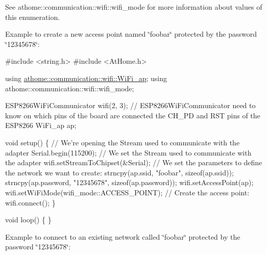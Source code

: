 See athome\+::communication\+::wifi\+::wifi\+\_\+mode for more information about values of this enumeration.

Example to create a new access point named \char`\"{}foobar\char`\"{} protected by the password \char`\"{}12345678\char`\"{}\+:


\begin{DoxyCode}
\textcolor{preprocessor}{#include <string.h>}
\textcolor{preprocessor}{#include <AtHome.h>}

\textcolor{keyword}{using} \mbox{\hyperlink{structathome_1_1communication_1_1wifi_1_1s__wifi__access__point}{athome::communication::wifi::WiFi\_ap}};
\textcolor{keyword}{using} athome::communication::wifi::wifi\_mode;

ESP8266WiFiCommunicator wifi(2, 3); \textcolor{comment}{// ESP8266WiFiCommunicator need to know}
on which pins of the board are connected the CH\_PD and RST pins of the
ESP8266 WiFi\_ap ap;

\textcolor{keywordtype}{void} setup() \{
  \textcolor{comment}{// We're opening the Stream used to communicate with the adapter}
  Serial.begin(115200);
  \textcolor{comment}{// We set the Stream used to communicate with the adapter}
  wifi.setStreamToChipset(&Serial);
  \textcolor{comment}{// We set the parameters to define the network we want to create:}
  strncpy(ap.ssid, \textcolor{stringliteral}{"foobar"}, \textcolor{keyword}{sizeof}(ap.ssid));
  strncpy(ap.password, \textcolor{stringliteral}{"12345678"}, \textcolor{keyword}{sizeof}(ap.password));
  wifi.setAccessPoint(ap);
  wifi.setWiFiMode(wifi\_mode::ACCESS\_POINT);
  \textcolor{comment}{// Create the access point:}
  wifi.connect();
\}

\textcolor{keywordtype}{void} loop() \{
\}
\end{DoxyCode}


Example to connect to an existing network called \char`\"{}foobar\char`\"{} protected by the password \char`\"{}12345678\char`\"{}\+:


